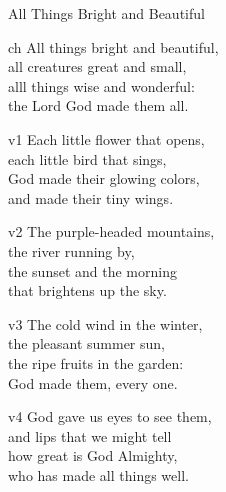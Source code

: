 \begin{song}{All Things Bright and Beautiful}
    \begin{songframe}{ch}
        All things bright and beautiful, \\
        all creatures great and small, \\
        alll things wise and wonderful: \\
        the Lord God made them all.
    \end{songframe}

    \begin{songframe}{v1}
        Each little flower that opens, \\
        each little bird that sings, \\
        God made their glowing colors, \\
        and made their tiny wings.
    \end{songframe}

    \begin{songframe}{v2}
        The purple-headed mountains, \\
        the river running by, \\
        the sunset and the morning \\
        that brightens up the sky.
    \end{songframe}

    \begin{songframe}{v3}
        The cold wind in the winter, \\
        the pleasant summer sun, \\
        the ripe fruits in the garden: \\
        God made them, every one.
    \end{songframe}

    \begin{songframe}{v4}
        God gave us eyes to see them, \\
        and lips that we might tell \\
        how great is God Almighty, \\
        who has made all things well.
    \end{songframe}

  

\end{song}
\endinput
